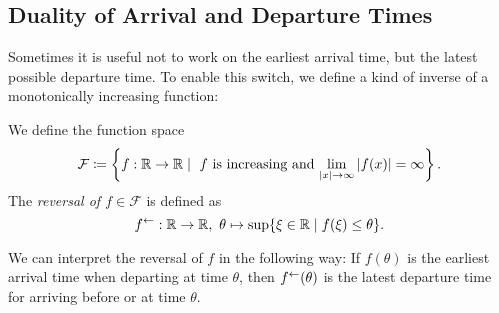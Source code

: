 \subsection{Duality of Arrival and Departure Times}

Sometimes it is useful not to work on the earliest arrival time, but the latest possible departure time.
To enable this switch, we define a kind of inverse of a monotonically increasing function:

\newcommand{\IncCoercive}{\mathcal{F}}
\begin{definition}
    We define the function space 
    \[
        \IncCoercive \coloneqq \left\{ f:\R \rightarrow \R \mid \text{ $f$ is increasing and $ \lim_{\abs{x}\rightarrow\infty} \abs{f(x)} = \infty$} \right\}.
    \]
    The \emph{reversal of $f\in\IncCoercive$} is defined as 
    \[
        \minv{f}:\R \rightarrow \R,\ \theta\mapsto \sup \{ \xi\in\R \mid f(\xi) \leq \theta \}.
    \]
\end{definition}

We can interpret the reversal of $f$ in the following way:
If $f(\theta)$ is the earliest arrival time when departing at time $\theta$, then $f^{\leftarrow}(\theta)$ is the latest departure time for arriving before or at time $\theta$.


